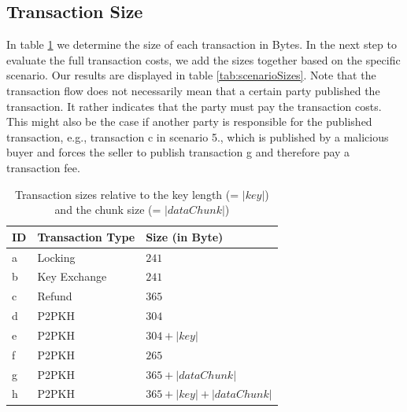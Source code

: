 \documentclass{cacthesis}
\begin{document}
	    \subsection{Transaction Size}
	    In table \ref{tab:txSizes} we determine the size of each transaction in Bytes. In the next step to evaluate the full transaction costs, we add the sizes together based on the specific scenario. Our results are displayed in table \ref{tab:scenarioSizes}. Note that the transaction flow does not necessarily mean that a certain party published the transaction. It rather indicates that the party must pay the transaction costs. This might also be the case if another party is responsible for the published transaction, e.g., transaction c in scenario 5., which is published by a malicious buyer and forces the seller to publish transaction g and therefore pay a transaction fee.
	    
	    \begin{table}[]
        \centering
        \begin{tabular}{l|l|l}
        ID & Transaction Type & Size (in Byte)     \\ \hline
        a  & Locking          & $241$                  \\
        b  & Key Exchange     & $241$                  \\
        c  & Refund           & $365$                  \\
        d  & P2PKH            & $304$                  \\
        e  & P2PKH            & $304 + |key|$          \\
        f  & P2PKH            & $265$                  \\
        g  & P2PKH            & $365 + |dataChunk|$  \\
        h  & P2PKH            & $365 + |key| + |dataChunk|$
        \end{tabular}
        \caption{Transaction sizes relative to the key length (= $|key|$) and the chunk size (= $|dataChunk|$)}
        \label{tab:txSizes}
        \end{table}
        
\end{document}
